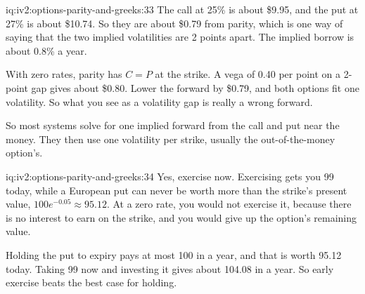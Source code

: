 \begin{solution}{iq:iv2:options-parity-and-greeks:33}
The call at 25\% is about \$9.95, and the put at 27\% is about \$10.74. So they are about \$0.79 from parity, which is one way of saying that the two implied volatilities are 2 points apart. The implied borrow is about 0.8\% a year.

With zero rates, parity has $C = P$ at the strike. A vega of 0.40 per point on a 2-point gap gives about \$0.80. Lower the forward by \$0.79, and both options fit one volatility. So what you see as a volatility gap is really a wrong forward.

So most systems solve for one implied forward from the call and put near the money. They then use one volatility per strike, usually the out-of-the-money option's.

\end{solution}

\begin{solution}{iq:iv2:options-parity-and-greeks:34}
Yes, exercise now. Exercising gets you 99 today, while a European put can never be worth more than the strike's present value, $100e^{-0.05} \approx 95.12$. At a zero rate, you would not exercise it, because there is no interest to earn on the strike, and you would give up the option's remaining value.

Holding the put to expiry pays at most 100 in a year, and that is worth 95.12 today. Taking 99 now and investing it gives about 104.08 in a year. So early exercise beats the best case for holding.

\end{solution}

